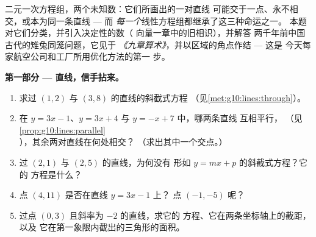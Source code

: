 \begin{problem}
\label{pb:g10:lines:1}
二元一次方程组，两个未知数：它们所画出的一对直线
可能交于一点、永不相交，或本为同一条直线 --- 而
\emph{每一个}线性方程组都继承了这三种命运之一。
本题对它们分类，并引入决定性的数（
向量一章中的旧相识），并解答
两千年前中国古代的雉兔同笼问题，它见于
\emph{《九章算术》}，并以区域的角点作结 --- 这是
今天每家航空公司和工厂所用优化方法的第一
步。

\medskip
\noindent\textbf{第一部分 --- 直线，信手拈来。}
\begin{enumerate}
  \item 求过
        $(1, 2)$ 与 $(3, 8)$ 的直线的斜截式方程
        （见\cref{met:g10:lines:through}）。
  \item 在 $y = 3x - 1$、$y = 3x + 4$ 与 $y = -x + 7$ 中，哪两条直线
        互相平行，
        （见\cref{prop:g10:lines:parallel}），其余两对直线在何处相交？
        （求出其中一个交点。）
  \item 过 $(2, 1)$ 与 $(2, 5)$ 的直线，为何没有
        形如 $y = mx + p$ 的斜截式方程？它的
        方程是什么？
  \item 点 $(4, 11)$ 是否在直线 $y = 3x - 1$ 上？
        点 $(-1, -5)$ 呢？
  \item 过点 $(0, 3)$ 且斜率为 $-2$ 的直线，求它的
        方程、它在两条坐标轴上的截距，以及
        它在第一象限内截出的三角形的面积。
\end{enumerate}


\end{problem}
